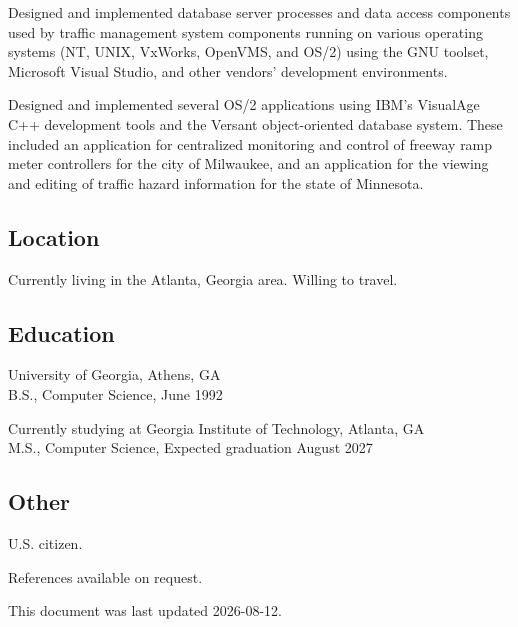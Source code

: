 Designed and implemented database server processes and data access
components used by traffic management system components running on
various operating systems (NT, UNIX, VxWorks, OpenVMS, and OS/2) using
the GNU toolset, Microsoft Visual Studio, and other vendors' development
environments.

Designed and implemented several OS/2 applications using IBM's VisualAge
C++ development tools and the Versant object-oriented database system.
These included an application for centralized monitoring and control of
freeway ramp meter controllers for the city of Milwaukee, and an
application for the viewing and editing of traffic hazard information
for the state of Minnesota.

\subsection{Location}\label{location}

Currently living in the Atlanta, Georgia area. Willing to travel.

\subsection{Education}\label{education}

University of Georgia, Athens, GA\\
B.S., Computer Science, June 1992

Currently studying at Georgia Institute of Technology, Atlanta, GA\\
M.S., Computer Science, Expected graduation August 2027

\subsection{Other}\label{other}

U.S. citizen.

References available on request.

This document was last updated 2026-08-12.
